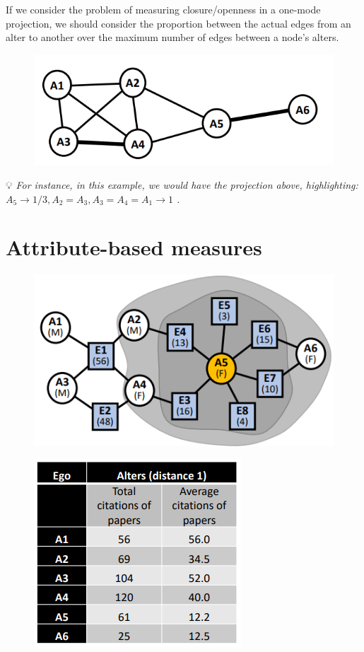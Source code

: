 \documentclass[
  notitlepage,
  onecolumn,
  openany]{book}
\begin{document}
If we consider the problem of measuring closure/openness in a one-mode projection, we should consider the proportion between the actual edges from an alter to another over the maximum number of edges between a node's alters.

\begin{figure}[h!]

{\centering \includegraphics[width=0.5\linewidth]{images/10-Two mode networks/Untitled 11} 

}

\end{figure}

💡 \emph{For instance, in this example, we would have the projection above, highlighting:
\(A_5 \rightarrow 1/3, A_2=A_3, A_3=A_4= A_1\rightarrow 1\) .}

\hypertarget{attribute-based-measures}{%
\section{Attribute-based measures}\label{attribute-based-measures}}

\begin{figure}[h!]

{\centering \includegraphics[width=0.4\linewidth]{images/10-Two mode networks/Untitled 12} 

}

\end{figure}

\begin{figure}[h!]

{\centering \includegraphics[width=0.4\linewidth]{images/10-Two mode networks/Untitled 13} 

}

\end{figure}
\end{document}
